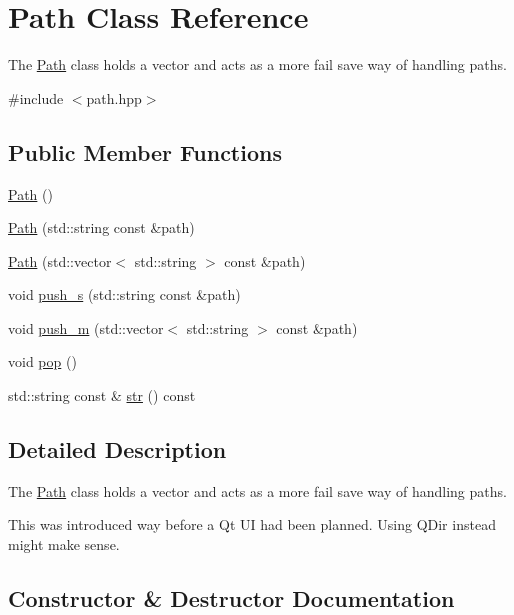 \hypertarget{class_path}{}\section{Path Class Reference}
\label{class_path}


The \mbox{\hyperlink{class_path}{Path}} class holds a vector and acts as a more fail save way of handling paths.  




{\ttfamily \#include $<$path.\+hpp$>$}

\subsection*{Public Member Functions}
\begin{DoxyCompactItemize}
\item 
\mbox{\hyperlink{class_path_af26cfab021ddf49af73da3b2beca85ac}{Path}} ()
\item 
\mbox{\hyperlink{class_path_ae560f045f52d39eacdac15ec28b0b8b8}{Path}} (std\+::string const \&path)
\item 
\mbox{\hyperlink{class_path_ab8cc1ce5a7c3f79bb5e730fd847c846e}{Path}} (std\+::vector$<$ std\+::string $>$ const \&path)
\item 
void \mbox{\hyperlink{class_path_af270e6e39de7389980e4c6d0cf9fdd37}{push\+\_\+s}} (std\+::string const \&path)
\item 
void \mbox{\hyperlink{class_path_a32a30af9ac4989b875079b01ff9d2825}{push\+\_\+m}} (std\+::vector$<$ std\+::string $>$ const \&path)
\item 
void \mbox{\hyperlink{class_path_a0f02b5b2384900e3fe1c3efadea6c0ca}{pop}} ()
\item 
std\+::string const  \& \mbox{\hyperlink{class_path_a7c1a4772ea53d546d9cd2dad199fd633}{str}} () const
\end{DoxyCompactItemize}


\subsection{Detailed Description}
The \mbox{\hyperlink{class_path}{Path}} class holds a vector and acts as a more fail save way of handling paths. 

This was introduced way before a Qt UI had been planned. Using Q\+Dir instead might make sense. 

\subsection{Constructor \& Destructor Documentation}
\mbox{\label{class_path_af26cfab021ddf49af73da3b2beca85ac}} 
